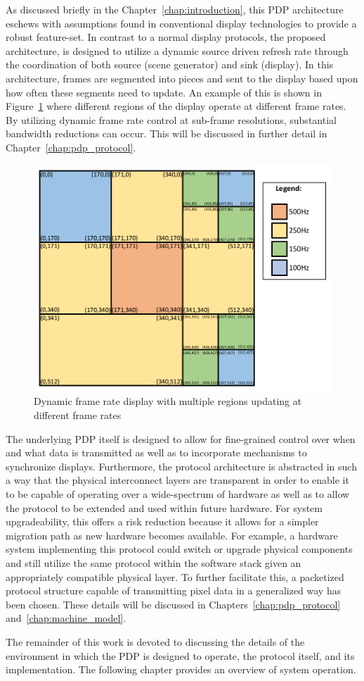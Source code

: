     As discussed briefly in the Chapter~\ref{chap:introduction}, this PDP architecture eschews with assumptions found in conventional display technologies to provide a robust feature-set. In contrast to a normal display protocols, the proposed architecture, is designed to utilize a dynamic source driven refresh rate through the coordination of both source (scene generator) and sink (display). In this architecture, frames are segmented into pieces and sent to the display based upon how often these segments need to update. An example of this is shown in Figure~\ref{fig:variable_display} where different regions of the display operate at different frame rates. By utilizing dynamic frame rate control at sub-frame resolutions, substantial bandwidth reductions can occur. This will be discussed in further detail in Chapter~\ref{chap:pdp_protocol}.

    \begin{figure}
        \centering
        \includegraphics[width=1.0\textwidth]{fig/variable_display.pdf}
        \caption{Dynamic frame rate display with multiple regions updating at different frame rates}
        \label{fig:variable_display}
    \end{figure}

    The underlying PDP itself is designed to allow for fine-grained control over when and what data is transmitted as well as to incorporate mechanisms to synchronize displays. Furthermore, the protocol architecture is abstracted in such a way that the physical interconnect layers are transparent in order to enable it to be capable of operating over a wide-spectrum of hardware as well as to allow the protocol to be extended and used within future hardware. For system upgradeability, this offers a risk reduction because it allows for a simpler migration path as new hardware becomes available. For example, a hardware system implementing this protocol could switch or upgrade physical components and still utilize the same protocol within the software stack given an appropriately compatible physical layer. To further facilitate this, a packetized protocol structure capable of transmitting pixel data in a generalized way has been chosen. These details will be discussed in Chapters~\ref{chap:pdp_protocol} and~\ref{chap:machine_model}.

    The remainder of this work is devoted to discussing the details of the environment in which the PDP is designed to operate, the protocol itself, and its implementation. The following chapter provides an overview of system operation.
